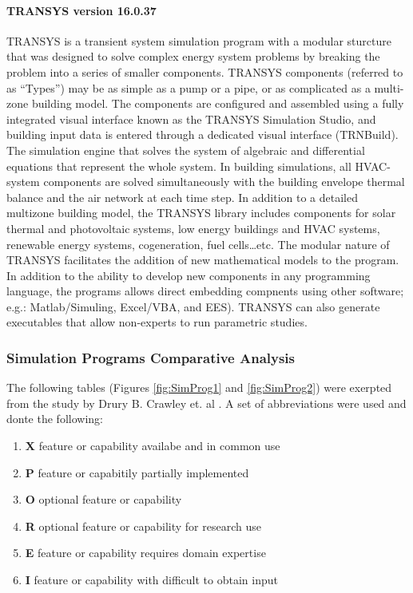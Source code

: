 \paragraph{TRANSYS version 16.0.37} TRANSYS is a transient system simulation program with a modular sturcture that was designed to solve complex energy system problems by breaking the problem into a series of smaller components. TRANSYS components (referred to as ``Types'') may be as simple as a pump or a pipe, or as complicated as a multi-zone building model. The components are configured and assembled using a fully integrated visual interface known as the TRANSYS Simulation Studio, and building input data is entered through a dedicated visual interface (TRNBuild). The simulation engine that solves the system of algebraic and differential equations that represent the whole system. In building simulations, all HVAC-system components are solved simultaneously with the building envelope thermal balance and the air network at each time step. In addition to a detailed multizone building model, the TRANSYS library includes components for solar thermal and photovoltaic systems, low energy buildings and HVAC systems, renewable energy systems, cogeneration, fuel cells\ldots etc. The modular nature of TRANSYS facilitates the addition of new mathematical models to the program. In addition to the ability to develop new components in any programming language, the programs allows direct embedding compnents using other software; e.g.: Matlab/Simuling, Excel/VBA, and EES). TRANSYS can also generate executables that allow non-experts to run parametric studies.

\subsubsection{Simulation Programs Comparative Analysis}

The following tables (Figures \ref{fig:SimProg1} and \ref{fig:SimProg2}) were exerpted from the study by Drury B. Crawley et. al \cite{crawley05}. A set of abbreviations were used and donte the following:

\begin{enumerate}
\item \textbf{X} feature or capability availabe and in common use
\item \textbf{P} feature or capabitily partially implemented
\item \textbf{O} optional feature or capability
\item \textbf{R} optional feature or capability for research use
\item \textbf{E} feature or capability requires domain expertise
\item \textbf{I} feature or capability with difficult to obtain input
\end{enumerate}

